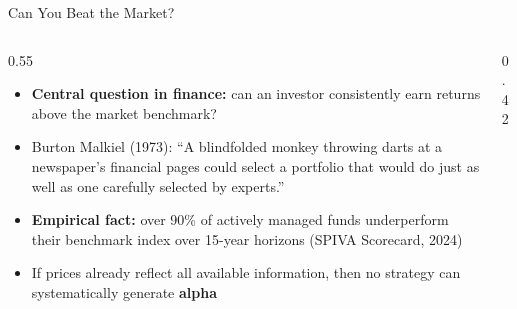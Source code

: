 \documentclass[9pt, aspectratio=169, t]{beamer}
\theoremstyle{definition}
\newenvironment{cminipage}[1]{%
    \par\noindent\hfill\begin{minipage}{#1}\ignorespaces
}{%
    \end{minipage}\hfill\null\par
}
\begin{document}
\begin{frame}{Can You Beat the Market?}
\begin{cminipage}{0.95\textwidth}
\begin{columns}[T]
\begin{column}{0.55\textwidth}
\begin{itemize}\setlength{\itemsep}{0pt}
    \item \textbf{Central question in finance:} can an investor consistently earn returns above the market benchmark?
    \item Burton Malkiel (1973): ``A blindfolded monkey throwing darts at a newspaper's financial pages could select a portfolio that would do just as well as one carefully selected by experts.''
    \item \textbf{Empirical fact:} over 90\% of actively managed funds underperform their benchmark index over 15-year horizons (SPIVA Scorecard, 2024)
    \item If prices already reflect all available information, then no strategy can systematically generate \textbf{alpha}
\end{itemize}
\end{column}
\begin{column}{0.42\textwidth}
\begin{center}
\end{center}
\end{column}
\end{columns}
\end{cminipage}
\end{frame}
\end{document}
